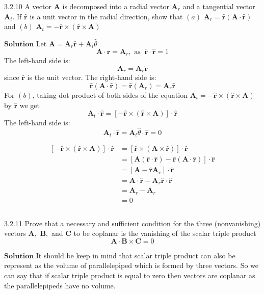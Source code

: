 \newpage


\begin{mybox}{3.2.10}
A vector $\mathbf{A}$ is decomposed into a radial vector $\mathbf{A}_{r}$ and a tangential vector $\mathbf{A}_{t} .$ If $\hat{\mathbf{r}}$ is a unit vector in the radial direction, show that
$(a)$ $\mathbf{A}_{r}=\hat{\mathbf{r}}(\mathbf{A} \cdot \hat{\mathbf{r}})$ and
$(b)$ $\mathbf{A}_{t}=-\hat{\mathbf{r}} \times(\hat{\mathbf{r}} \times \mathbf{A})$
\end{mybox}


$\boxed{\textbf{Solution}}$ Let $\mathbf{A}=\mathbf{A}_{r} \hat{\mathbf{r}}+\mathbf{A}_{i} \hat{\theta}$
$$
\mathbf{A} \cdot \hat{\mathbf{r}}=\mathbf{A}_{r}, \text { as } \ \hat{\mathbf{r}} \cdot \hat{\mathbf{r}}=1
$$
The left-hand side is:
$$\mathbf{A}_{r}=\mathbf{A}_{r} \hat{\mathbf{r}}$$ since $\hat{\mathbf{r}}$ is the unit vector.
The right-hand side is:
$$
\hat{\mathbf{r}}(\mathbf{A} \cdot \hat{\mathbf{r}})=\hat{\mathbf{r}}\left(\mathbf{A}_{r}\right)=\mathbf{A}_{r} \hat{\mathbf{r}}
$$
For $(b)$, taking dot product of both sides of the equation $\mathbf{A}_{t}=-\hat{\mathbf{r}} \times(\hat{\mathbf{r}} \times \mathbf{A})$ by $\hat{\mathbf{r}}$ we get
$$
\mathbf{A}_{t} \cdot \hat{\mathbf{r}}=[-\hat{\mathbf{r}} \times(\hat{\mathbf{r}} \times \mathbf{A})] \cdot \hat{\mathbf{r}}
$$
The left-hand side is:
$$
\mathbf{A}_{t} \cdot \hat{\mathbf{r}}=\mathbf{A}_{t} \hat{\theta} \cdot \hat{\mathbf{r}}=0
$$

$$
\begin{aligned}
[-\hat{\mathbf{r}} \times(\hat{\mathbf{r}} \times \mathbf{A})] \cdot \hat{\mathbf{r}}&=[\hat{\mathbf{r}} \times(\mathbf{A} \times \hat{\mathbf{r}})] \cdot \hat{\mathbf{r}} \\
&=[\mathbf{A}(\hat{\mathbf{r}} \cdot \hat{\mathbf{r}})-\hat{\mathbf{r}}(\mathbf{A} \cdot \hat{\mathbf{r}})] \cdot \hat{\mathbf{r}} \\
&=\left[\mathbf{A}-\hat{\mathbf{r}} \mathbf{A}_{r}\right] \cdot \hat{\mathbf{r}} \\
&=\mathbf{A} \cdot \hat{\mathbf{r}}-\mathbf{A}_{r} \hat{\mathbf{r}} \cdot \hat{\mathbf{r}} \\
&=\mathbf{A}_{r}-\mathbf{A}_{r}\\
&=0
\end{aligned}
$$

$$$$

\begin{mybox}{3.2.11}
Prove that a necessary and sufficient condition for the three (nonvanishing) vectors $\mathbf{A},$ $\mathbf{B},$ and $\mathbf{C}$ to be coplanar is the vanishing of the scalar triple product
$$
\mathbf{A} \cdot \mathbf{B} \times \mathbf{C}=0
$$
\end{mybox}
$\boxed{\textbf{Solution}}$ It should be keep in mind that scalar triple product can also be represent as the volume of
parallelepiped which is formed by three vectors. So we can say that if scalar triple product is equal to zero then vectors are coplanar as the parallelepipeds have no volume.

